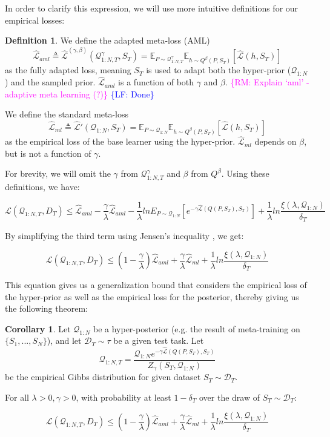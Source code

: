 \documentclass{article}
\theoremstyle{definition}
\newtheorem{defn}{Definition}[section]
\newtheorem{corollary}{Corollary}[section]
\newcommand{\RM}[1]{\textcolor{magenta}{\{RM: #1\}}}
\newcommand{\LF}[1]{\textcolor{blue}{\{LF: #1\}}}
\begin{document}
In order to clarify this expression, we will use more intuitive definitions for our empirical losses:
\begin{defn}
	We define the adapted meta-loss (AML) $$\hat{\mathcal{L}}_{aml}\triangleq \hat{\mathcal{L}}^{(\gamma,\beta)}(\mathcal{Q}^{\gamma}_{1:N,T}, S_T)=\mathbb{E}_{P\sim \mathcal{Q}^{\gamma}_{1:N,T}}\mathbb{E}_{h\sim Q^{\beta}(P,S_T)}\left [\hat{\mathcal{L}}(h, S_T)\right ]$$ as the fully adapted loss, meaning $S_T$ is used to adapt both the hyper-prior ($\mathcal{Q}_{1:N}$) and the sampled prior. $\hat{\mathcal{L}}_{aml}$ is a function of both $\gamma$ and $\beta$. \RM{Explain `aml' - adaptive meta learning (?)} \LF{Done}
	
	We define the standard meta-loss $$\hat{\mathcal{L}}_{ml}\triangleq \hat{\mathcal{L}}'(\mathcal{Q}_{1:N}, S_T)=\mathbb{E}_{P\sim \mathcal{Q}_{1:N}}\mathbb{E}_{h\sim Q^{\beta}(P,S_T)}\left [\hat{\mathcal{L}}(h, S_T)\right ]$$ as the empirical loss of the base learner using the hyper-prior. $\hat{\mathcal{L}}_{ml}$ depends on $\beta$, but is not a function of $\gamma$.
\end{defn}

For brevity, we will omit the $\gamma$ from $\mathcal{Q}^{\gamma}_{1:N,T}$ and $\beta$ from $Q^{\beta}$. Using these definitions, we have:

$$\mathcal{L}(\mathcal{Q}_{1:N,T}, D_T) \leq \hat{\mathcal{L}}_{aml} -\frac{\gamma}{\lambda}\hat{\mathcal{L}}_{aml} - \frac{1}{\lambda}lnE_{P\sim \mathcal{Q}_{1:N}}\left [e^{-\gamma\hat{\mathcal{L}}(Q(P,S_T),S_T)}\right ]+\frac{1}{\lambda}ln\frac{\xi(\lambda,\mathcal{Q}_{1:N})}{\delta_T}$$

By simplifying the third term using Jensen's inequality , we get:

\begin{equation} \label{eq:pb-adapt-multi}
\mathcal{L}(\mathcal{Q}_{1:N,T}, D_T) \leq 
(1-\frac{\gamma}{\lambda})\hat{\mathcal{L}}_{aml} + \frac{\gamma}{\lambda}\hat{\mathcal{L}}_{ml} 
+\frac{1}{\lambda}ln\frac{\xi(\lambda,\mathcal{Q}_{1:N})}{\delta_T}
\end{equation}

This equation gives us a generalization bound that considers the empirical loss of the hyper-prior as well as the empirical loss for the posterior, thereby giving us the following theorem:

\begin{corollary} \label{thm:main-result-gibbs}
	Let $\mathcal{Q}_{1:N}$ be a hyper-posterior (e.g. the result of meta-training on $\{S_1,...,S_N\}$), and let $\mathcal{D}_T\sim \tau$ be a given test task. Let $$\mathcal{Q}_{1:N,T}= \frac{\mathcal{Q}_{1:N}e^{-\gamma\hat{\mathcal{L}}(Q(P,S_T),S_T)}}{Z_\gamma(S_T, \mathcal{Q}_{1:N})}$$ be the empirical Gibbs distribution for given dataset $S_T\sim \mathcal{D}_T$.
	
	For all $\lambda>0, \gamma>0$, 
	with probability at least $1-\delta_T$ over the draw of $S_T\sim \mathcal{D}_T$:
	
	$$\mathcal{L}(\mathcal{Q}_{1:N,T}, D_T) \leq 
	(1-\frac{\gamma}{\lambda})\hat{\mathcal{L}}_{aml} + \frac{\gamma}{\lambda}\hat{\mathcal{L}}_{ml} 
	+\frac{1}{\lambda}ln\frac{\xi(\lambda,\mathcal{Q}_{1:N})}{\delta_T}$$
\end{corollary}
\end{document}
